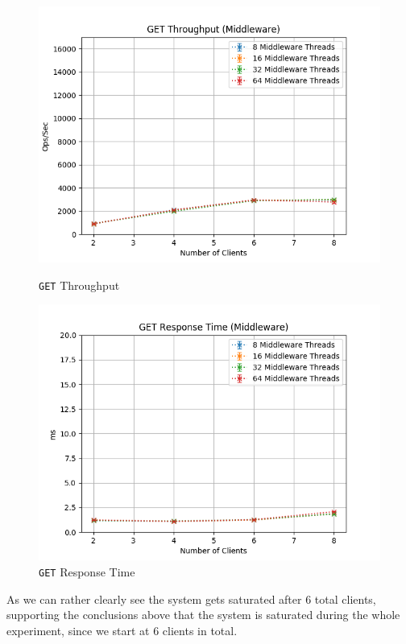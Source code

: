 \documentclass[11pt,a4paper]{article}
\begin{document}
\begin{figure}[H]
	\centering
	\captionsetup{width=0.4\textwidth}
    \begin{minipage}{0.5\textwidth}
        \centering
        \includegraphics[width=\textwidth]{../illustrations/plots/2_2_1_two_middlewares_reduced/0-1/middleware_get_tp_s.png}
        \caption{\texttt{GET} Throughput}
        \label{fig:two_middlewares_reduced_get_tp_mw}
    \end{minipage}\hfill
    \begin{minipage}{0.5\textwidth}
        \centering
        \includegraphics[width=\textwidth]{../illustrations/plots/2_2_1_two_middlewares_reduced/0-1/middleware_get_rt_ms.png}
        \caption{\texttt{GET} Response Time}
        \label{fig:two_middlewares_reduced_get_rt_mw}
    \end{minipage}
\end{figure}
%
As we can rather clearly see the system gets saturated after 6 total clients, supporting the conclusions above that the system is saturated during the whole experiment, since we start at 6 clients in total.
%
\end{document}
